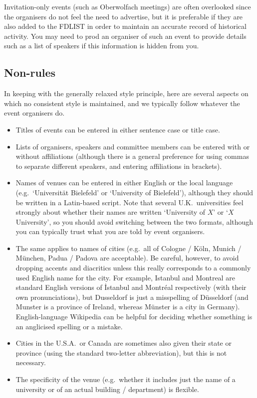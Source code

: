 \documentclass[12pt]{scrartcl}
\theoremstyle{definition}
\begin{document}
Invitation-only events (such as Oberwolfach meetings) are often overlooked since the organisers do not feel the need to advertise, but it is preferable if they are also added to the FDLIST in order to maintain an accurate record of historical activity.
You may need to prod an organiser of such an event to provide details such as a list of speakers if this information is hidden from you.

\subsection{Non-rules}
\label{s:non-rules}
In keeping with the generally relaxed style principle, here are several aspects on which no consistent style is maintained, and we typically follow whatever the event organisers do.

\begin{itemize}
\item Titles of events can be entered in either sentence case or title case.
\item Lists of organisers, speakers and committee members can be entered with or without affiliations (although there is a general preference for using commas to separate different speakers, and entering affiliations in brackets).
\item Names of venues can be entered in either English or the local language (e.g.\ `Universität Bielefeld' or `University of Bielefeld'), although they should be written in a Latin-based script. Note that several U.K.\ universities feel strongly about whether their names are written `University of $X$' or `$X$ University', so you should avoid switching between the two formats, although you can typically trust what you are told by event organisers.
\item The same applies to names of cities (e.g.\ all of Cologne / Köln, Munich / München, Padua / Padova are acceptable).
Be careful, however, to avoid dropping accents and diacritics unless this really corresponds to a commonly used English name for the city.
For example, Istanbul and Montreal are standard English versions of İstanbul and Montréal respectively (with their own pronunciations), but Dusseldorf is just a misspelling of Düsseldorf (and Munster is a province of Ireland, whereas Münster is a city in Germany).
English-language Wikipedia can be helpful for deciding whether something is an anglicised spelling or a mistake.
\item Cities in the U.S.A.\ or Canada are sometimes also given their state or province (using the standard two-letter abbreviation), but this is not necessary.
\item The specificity of the venue (e.g.\ whether it includes just the name of a university or of an actual building / department) is flexible.
\end{itemize}
\end{document}
